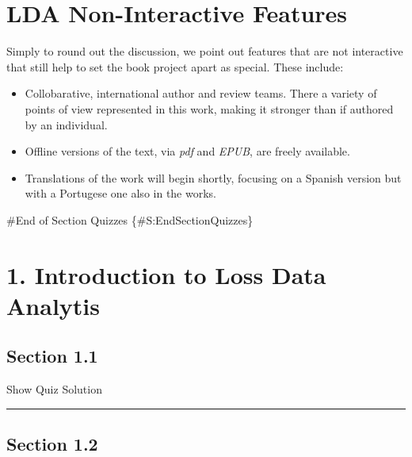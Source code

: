\documentclass[
]{book}
\providecommand{\tightlist}{%
  \setlength{\itemsep}{0pt}\setlength{\parskip}{0pt}}
\begin{document}
\hypertarget{S:NonFeatures}{%
\section{LDA Non-Interactive Features}\label{S:NonFeatures}}

Simply to round out the discussion, we point out features that are not interactive that still help to set the book project apart as special. These include:

\begin{itemize}
\tightlist
\item
  Collobarative, international author and review teams. There a variety of points of view represented in this work, making it stronger than if authored by an individual.
\item
  Offline versions of the text, via \emph{pdf} and \emph{EPUB}, are freely available.
\item
  Translations of the work will begin shortly, focusing on a Spanish version but with a Portugese one also in the works.
\end{itemize}

\#End of Section Quizzes \{\#S:EndSectionQuizzes\}

\hypertarget{introduction-to-loss-data-analytis}{%
\section{1. Introduction to Loss Data Analytis}\label{introduction-to-loss-data-analytis}}

\hypertarget{section-1.1}{%
\subsection{Section 1.1}\label{section-1.1}}

\hypertarget{surveyElement11}{}

\hypertarget{surveyResult11}{}

Show Quiz Solution

\hypertarget{display.Quiz11.2}{}
\begin{center}\rule{0.5\linewidth}{0.5pt}\end{center}

\hypertarget{section-1.2}{%
\subsection{Section 1.2}\label{section-1.2}}

\hypertarget{surveyElement12}{}
\end{document}
